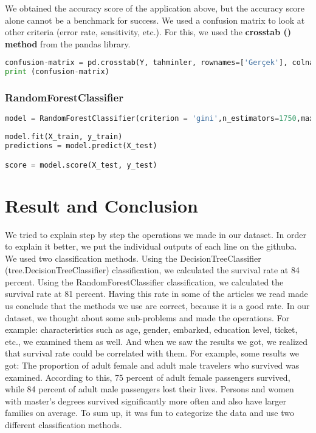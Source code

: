 \documentclass[onecolumn]{article}
\begin{document}
 We obtained the accuracy score of the application above, but the
 accuracy score alone cannot be a benchmark for success.
 We used a confusion matrix to look at other criteria (error rate, sensitivity, etc.).
For this, we used the \textbf{crosstab () method} from the pandas library.


\begin{lstlisting}[language=Python, caption= modeling] 
confusion-matrix = pd.crosstab(Y, tahminler, rownames=['Gerçek'], colnames=['Tahmin'])
print (confusion-matrix)
\end{lstlisting}

\subsubsection{RandomForestClassifier}

\begin{lstlisting}[language=Python, caption=  RandomForestClassifier ] 
model = RandomForestClassifier(criterion = 'gini',n_estimators=1750,max_depth=7,min_samples_split =6, min_samples_leaf = 6, max_features = 'auto', oob_score= True, random_state=42, n_jobs=-1,verbose =1)
            
model.fit(X_train, y_train)
predictions = model.predict(X_test)  

score = model.score(X_test, y_test)
\end{lstlisting}



\section{Result and Conclusion}
We tried to explain step by step the operations we made in our dataset. In order to explain it better, we put the individual outputs of each line on the githuba.
We used two classification methods.
Using the DecisionTreeClassifier (tree.DecisionTreeClassifier) ​​classification, we calculated the survival rate at 84 percent.
Using the RandomForestClassifier classification, we calculated the survival rate at 81 percent.
Having this rate in some of the articles we read made us conclude that the methods we use are correct, because it is a good rate.
In our dataset, we thought about some sub-problems and made the operations. For example: characteristics such as age, gender, embarked, education level, ticket, etc., we examined them as well.
And when we saw the results we got, we realized that survival rate could be correlated with them.
For example, some results we got:
The proportion of adult female and adult male travelers who survived was examined. According to this, 75 percent of adult female passengers survived, while 84 percent of adult male passengers lost their lives.
Persons and women with master's degrees survived significantly more often and also have larger families on average. 
To sum up, it was fun to categorize the data and use two different classification methods.
\end{document}
